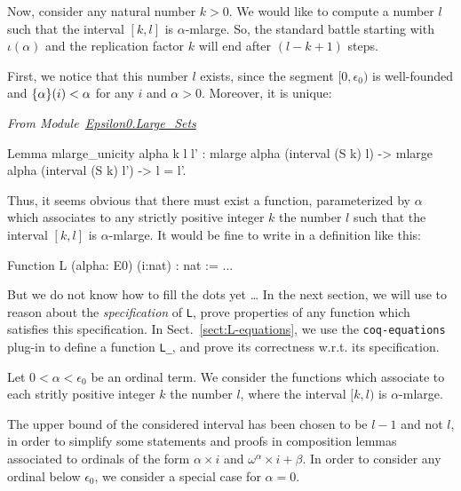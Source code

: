 \documentclass[a4paper]{book}
\begin{document}
Now, consider any natural number $k>0$. We would like to compute
a number $l$ such that the interval $[k,l]$ is $\alpha$-mlarge. So, 
the standard battle starting with $\iota(\alpha)$ and the replication factor $k$ will end after $(l-k+1)$ steps.



First, we notice that this  number $l$ exists, since the segment $[0,\epsilon_0)$ is well-founded and $\mbox{$\{\alpha\}(i)$}<\alpha$ for any $i$ and $\alpha>0$.
Moreover, it is unique:

\vspace{4pt}
\noindent
\emph{From Module~\href{../src/html/hydras.Epsilon0.Large_Sets.html}{Epsilon0.Large\_Sets}}
\begin{Coqsrc}
Lemma mlarge_unicity alpha k l l' : 
  mlarge alpha (interval (S k) l) ->
  mlarge alpha (interval (S k) l') ->
  l = l'.
\end{Coqsrc}

Thus, it seems obvious that there must exist a function, parameterized by $\alpha$ which associates to any  strictly positive integer $k$ the number $l$ such that
the interval $[k,l]$ is $\alpha$-mlarge. It would be fine to write in \gallina{} a definition like this:

\begin{Coqbad}
Function L (alpha: E0) (i:nat) :  nat := ...
\end{Coqbad}

But we do not know how to fill the dots yet \dots{}   In the next section, we will 
use \coq{} to reason  about the \emph{specification} of \texttt{L},
prove properties of any function which satisfies this specification.
In Sect.~\ref{sect:L-equations}, we use the \texttt{coq-equations} plug-in
to define a function \texttt{L\_}, and prove its correctness w.r.t. its specification.




Let $0<\alpha<\epsilon_0$ be an ordinal term. We consider the functions which associate to each stritly positive integer $k$ the number $l$, where 
the interval $[k,l)$ is $\alpha$-mlarge.

\begin{remark}
The upper bound of the considered interval has been chosen to be  $l-1$ and not $l$, in order to simplify some statements and proofs in composition lemmas associated to ordinals of the form $\alpha\times i$ and 
$\omega^\alpha\times i + \beta$.
In order to consider any ordinal below $\epsilon_0$, we consider a special case for $\alpha=0$.
\end{remark}
\end{document}
